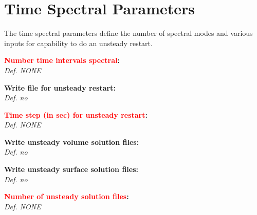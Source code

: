 \documentclass[12pt,epsf,colordvi]{article}
\begin{document}
\section{ Time Spectral Parameters}
% 
The time spectral parameters define the number of spectral modes and various inputs for capability to do an unsteady restart. 
% 
\begin{description}	
%
	\item{\bf \textcolor{red}{Number time intervals spectral}:}  \\
{\it Def. NONE}
%
 	\item{\bf Write file for unsteady restart:} \\
{\it Def. no}
%
	\item{\bf \textcolor{red}{Time step (in sec) for unsteady restart}:} \\
{\it Def. NONE}
%
 	\item{\bf  Write unsteady volume solution files:}  \\
{\it Def. no}
%
  	\item{\bf      Write unsteady surface solution files:} \\
{\it Def. no}
%
	\item{\bf \textcolor{red}{Number of unsteady solution files}:} \\
{\it Def. NONE}
%
\end{description}
%
\noindent 
\end{document}
